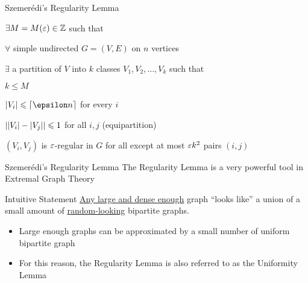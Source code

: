 \begin{frame}{Szemer\'{e}di's Regularity Lemma}

{
\begin{theorem}
\begin{description}[abc]
	\item<2->[$\bullet$] $\exists M = M(\varepsilon) \in {\mathbb Z}$ such that
	\begin{description}[abc]
		\item<3->[$\bullet$]  $\forall$ simple undirected  $G=(V,E)$ on $n$ vertices
		\begin{description}[abc]
			\item<4->[$\bullet$]  $\exists$ a partition of $V$ into $k$ classes $V_1, V_2, \dotsc, V_k$ such that
			\begin{description}[abc]
				\item<5->[$\bullet$] $k \leq M$
				\item<6->[$\bullet$] $|V_i| \leq \ceil{\epsilon n}$ for every $i$
				\item<7->[$\bullet$] $\left\vert{ |V_i| - |V_j| }\right\vert \leqslant 1$ for all $i,j$ (equipartition)
				\item<8->[$\bullet$] $(V_i, V_j)$ is $\varepsilon$-regular in $G$ for all except at most $\varepsilon k^2$ pairs $(i,j)$
			\end{description}
		\end{description}
	\end{description}
\end{description}
\end{theorem}}

\end{frame}

\begin{frame}{Szemer\'{e}di's Regularity Lemma}
The Regularity Lemma is a very powerful tool in Extremal Graph Theory
 
\begin{block}{Intuitive Statement}
	\ul{Any large and dense enough} graph ``looks like'' a union of a small amount of \ul{random-looking} bipartite graphs.
\end{block}

\begin{itemize}
	\item<2-> Large enough graphs can be approximated by a small number of uniform bipartite graph
	\item<3-> For this reason, the Regularity Lemma is also referred to as the Uniformity Lemma
\end{itemize}


\end{frame}

